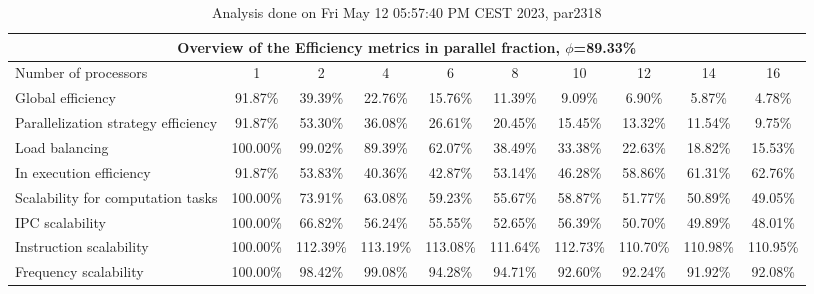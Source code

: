 \begin{table}[h]
\begin{center}
\begin{tabular}{|l|c|c|c|c|c|c|c|c|c|}
\hline
\multicolumn{10}{|c|}{Overview of the Efficiency metrics in parallel fraction, $\phi$=89.33\%} \\
\hline
\hline
Number of processors & 1 & 2 & 4 & 6 & 8 & 10 & 12 & 14 & 16 \\
\hline
\hline
Global efficiency                      &     91.87\% &     39.39\% &     22.76\% &     15.76\% &     11.39\% &      9.09\% &      6.90\% &      5.87\% &      4.78\% \\
\hline
\hline
Parallelization strategy efficiency &     91.87\% &     53.30\% &     36.08\% &     26.61\% &     20.45\% &     15.45\% &     13.32\% &     11.54\% &      9.75\% \\
\hline
Load balancing                   &    100.00\% &     99.02\% &     89.39\% &     62.07\% &     38.49\% &     33.38\% &     22.63\% &     18.82\% &     15.53\% \\
In execution efficiency          &     91.87\% &     53.83\% &     40.36\% &     42.87\% &     53.14\% &     46.28\% &     58.86\% &     61.31\% &     62.76\% \\
\hline
\hline
Scalability for computation tasks   &    100.00\% &     73.91\% &     63.08\% &     59.23\% &     55.67\% &     58.87\% &     51.77\% &     50.89\% &     49.05\% \\
\hline
IPC scalability                  &    100.00\% &     66.82\% &     56.24\% &     55.55\% &     52.65\% &     56.39\% &     50.70\% &     49.89\% &     48.01\% \\
Instruction scalability          &    100.00\% &    112.39\% &    113.19\% &    113.08\% &    111.64\% &    112.73\% &    110.70\% &    110.98\% &    110.95\% \\
Frequency scalability            &    100.00\% &     98.42\% &     99.08\% &     94.28\% &     94.71\% &     92.60\% &     92.24\% &     91.92\% &     92.08\% \\
\hline
\end{tabular}
\end{center}
\caption{ Analysis done on Fri May 12 05:57:40 PM CEST 2023, par2318}
\end{table}
